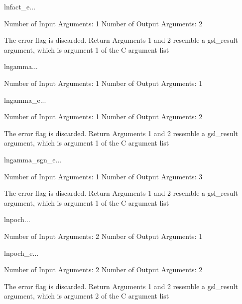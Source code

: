 \begin{funcdesc}{lnfact_e}{...}

    Number of Input  Arguments:  1
    Number of Output Arguments:  2

The error flag is discarded.
Return Arguments 1 and 2 resemble a gsl_result argument,
	which is  argument 1 of the C argument list

\end{funcdesc}

\begin{funcdesc}{lngamma}{...}

    Number of Input  Arguments:  1
    Number of Output Arguments:  1
\end{funcdesc}

\begin{funcdesc}{lngamma_e}{...}

    Number of Input  Arguments:  1
    Number of Output Arguments:  2

The error flag is discarded.
Return Arguments 1 and 2 resemble a gsl_result argument,
	which is  argument 1 of the C argument list

\end{funcdesc}

\begin{funcdesc}{lngamma_sgn_e}{...}

    Number of Input  Arguments:  1
    Number of Output Arguments:  3

The error flag is discarded.
Return Arguments 1 and 2 resemble a gsl_result argument,
	which is  argument 1 of the C argument list

\end{funcdesc}

\begin{funcdesc}{lnpoch}{...}

    Number of Input  Arguments:  2
    Number of Output Arguments:  1
\end{funcdesc}

\begin{funcdesc}{lnpoch_e}{...}

    Number of Input  Arguments:  2
    Number of Output Arguments:  2

The error flag is discarded.
Return Arguments 1 and 2 resemble a gsl_result argument,
	which is  argument 2 of the C argument list

\end{funcdesc}

